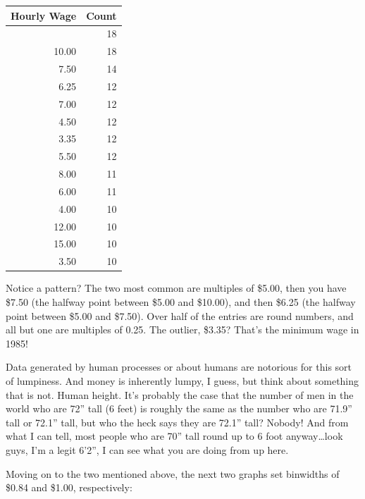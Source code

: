 \documentclass[
  letterpaper,
]{book}
\begin{document}
\begin{longtable}[]{@{}rr@{}}
\toprule\noalign{}
Hourly Wage & Count \\
\midrule\noalign{}
\endhead
\bottomrule\noalign{}
\endlastfoot
5.00 & 18 \\
10.00 & 18 \\
7.50 & 14 \\
6.25 & 12 \\
7.00 & 12 \\
4.50 & 12 \\
3.35 & 12 \\
5.50 & 12 \\
8.00 & 11 \\
6.00 & 11 \\
4.00 & 10 \\
12.00 & 10 \\
15.00 & 10 \\
3.50 & 10 \\
\end{longtable}

Notice a pattern? The two most common are multiples of \$5.00, then you
have \$7.50 (the halfway point between \$5.00 and \$10.00), and then
\$6.25 (the halfway point between \$5.00 and \$7.50). Over half of the
entries are round numbers, and all but one are multiples of 0.25. The
outlier, \$3.35? That's the minimum wage in 1985!

Data generated by human processes or about humans are notorious for this
sort of lumpiness. And money is inherently lumpy, I guess, but think
about something that is not. Human height. It's probably the case that
the number of men in the world who are 72'' tall (6 feet) is roughly the
same as the number who are 71.9'' tall or 72.1'' tall, but who the heck
says they are 72.1'' tall? Nobody! And from what I can tell, most people
who are 70'' tall round up to 6 foot anyway\ldots look guys, I'm a legit
6'2'', I can see what you are doing from up here.

Moving on to the two mentioned above, the next two graphs set binwidths
of \$0.84 and \$1.00, respectively:
\end{document}
